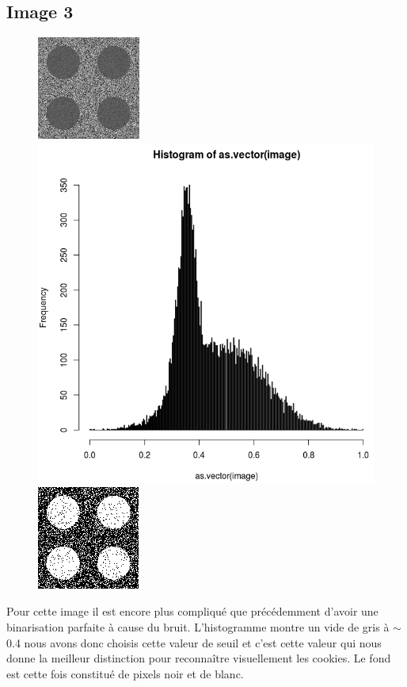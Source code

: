 \documentclass[a4paper,12pt]{report}
\begin{document}
\subsection*{Image 3}
\begin{figure}[!ht]
	\center
	\includegraphics[scale=0.5]{../rdf-2-classes-texture-3.png}
	\includegraphics[scale=0.3]{image/text3.png}
	\includegraphics[scale=0.5]{image/text31.png}
\end{figure}

Pour cette image il est encore plus compliqué que précédemment d'avoir une binarisation parfaite à cause du bruit. L'histogramme montre un vide de gris à $\sim$0.4 nous avons donc choisis cette valeur de seuil et c'est cette valeur qui nous donne la meilleur distinction pour reconnaître visuellement les cookies. Le fond est cette fois constitué de pixels noir et de blanc.
\end{document}
